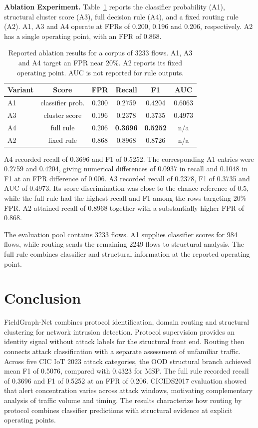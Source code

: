 \documentclass{article}
\begin{document}
\textbf{Ablation Experiment.} Table~\ref{tab:ablation} reports the classifier
probability (A1), structural cluster score (A3), full decision rule (A4), and a fixed
routing rule (A2). A1, A3 and A4 operate at FPRs of 0.200, 0.196 and
0.206, respectively. A2 has a single operating point, with an FPR of 0.868.

\begin{table}[h]
	\centering
	\caption{Reported ablation results for a corpus of 3233 flows. A1, A3 and A4 target
		an FPR near 20\%. A2 reports its fixed operating point. AUC is not reported for rule
		outputs.}
	\label{tab:ablation}
	\footnotesize
	\setlength{\tabcolsep}{4pt}
	\begin{tabular}{@{}lccccc@{}}
		\hline
		Variant & Score & FPR & Recall & F1 & AUC \\
		\hline
		A1 & classifier prob. & 0.200 & 0.2759 & 0.4204 & 0.6063 \\
		A3 & cluster score   & 0.196 & 0.2378 & 0.3735 & 0.4973 \\
		A4 & full rule       & 0.206 & \textbf{0.3696} & \textbf{0.5252} & n/a \\
		\hline
		A2 & fixed rule      & 0.868 & 0.8968 & 0.8726 & n/a \\
		\hline
	\end{tabular}
\end{table}

A4 recorded recall of 0.3696 and F1 of 0.5252. The corresponding A1 entries were
0.2759 and 0.4204, giving numerical differences of 0.0937 in recall and 0.1048 in
F1 at an FPR difference of 0.006. A3 recorded recall of 0.2378, F1 of 0.3735 and
AUC of 0.4973. Its score discrimination was close to the chance reference of 0.5,
while the full rule had the highest recall and F1 among the rows targeting 20\% FPR.
A2 attained recall of 0.8968 together with a substantially higher FPR of 0.868.

The evaluation pool contains 3233 flows. A1 supplies classifier scores for 984
flows, while routing sends the remaining 2249 flows to structural analysis. The full
rule combines classifier and structural information at the reported operating point.

\section{Conclusion}
\label{sec:conclusion}

FieldGraph-Net combines protocol identification, domain routing and structural
clustering for network intrusion detection. Protocol supervision provides an
identity signal without attack labels for the structural front end. Routing then
connects attack classification with a separate assessment of unfamiliar traffic.
Across five CIC IoT 2023 attack categories, the OOD structural branch achieved mean F1 of 0.5076,
compared with 0.4323 for MSP. The full rule recorded recall of 0.3696 and F1 of
0.5252 at an FPR of 0.206. CICIDS2017 evaluation showed that alert concentration
varies across attack windows, motivating complementary analysis of traffic volume
and timing. The results characterize how routing by protocol combines classifier predictions
with structural evidence at explicit operating points.
\end{document}
